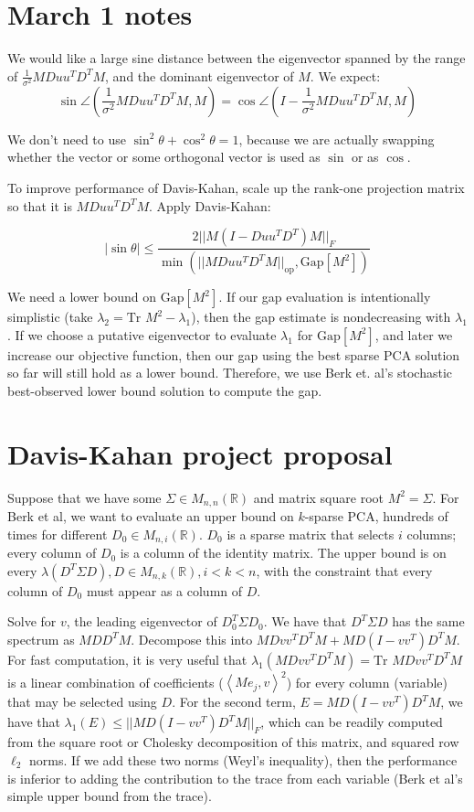 \documentclass{article}
\begin{document}
\section{March 1 notes}

We would like a large sine distance between the eigenvector spanned by the range of $\frac{1}{\sigma^2} MDuu^T D^T M$, and the dominant eigenvector of $M$. We expect: $$\sin \angle(\frac{1}{\sigma^2} MDuu^T D^T M, M) = \cos \angle (I-\frac{1}{\sigma^2} MDuu^T D^T M, M)$$

We don't need to use $\sin^2\theta + \cos^2\theta = 1$, because we are actually swapping whether the vector or some orthogonal vector is used as $\sin$ or as $\cos$.

To improve performance of Davis-Kahan, scale up the rank-one projection matrix so that it is $MDuu^T D^T M$. Apply Davis-Kahan:

$$
|\sin\theta|
\le
\frac{2||M(I-Duu^TD^T)M||_F}{\min(||MDuu^TD^TM||_\text{op}, \text{Gap}[M^2])}
$$

We need a lower bound on $\text{Gap}[M^2]$. If our gap evaluation is intentionally simplistic (take $\lambda_2 = \text{Tr }M^2 - \lambda_1$), then the gap estimate is nondecreasing with $\lambda_1$. If we choose a putative eigenvector to evaluate $\lambda_1$ for $\text{Gap}[M^2]$, and later we increase our objective function, then our gap using the best sparse PCA solution so far will still hold as a lower bound. Therefore, we use Berk et. al's stochastic best-observed lower bound solution to compute the gap.

\section{Davis-Kahan project proposal}

Suppose that we have some $\Sigma \in M_{n,n}(\mathbb{R})$ and matrix square root $M^2 = \Sigma$. For Berk et al, we want to evaluate an upper bound on $k$-sparse PCA, hundreds of times for different $D_0 \in M_{n,i}(\mathbb{R})$. $D_0$ is a sparse matrix that selects $i$ columns; every column of $D_0$ is a column of the identity matrix. The upper bound is on every $\lambda(D^T \Sigma D), D \in M_{n,k}(\mathbb{R}), i < k < n$, with the constraint that every column of $D_0$ must appear as a column of $D$.

Solve for $v$, the leading eigenvector of $D_0^T \Sigma D_0$. We have that $D^T\Sigma D$ has the same spectrum as $M D D^T M$. Decompose this into $M D v v^T D^T M + M D (I - vv^T) D^T M$. For fast computation, it is very useful that $\lambda_1(MDvv^T D^T M) = \text{Tr }MDvv^T D^T M$ is a linear combination of coefficients ($\left< M e_j, v \right>^2$) for every column (variable) that may be selected using $D$. For the second term, $E = MD(I-vv^T) D^T M$, we have that $\lambda_1(E) \le ||MD(I - vv^T) D^T M||_F$, which can be readily computed from the square root or Cholesky decomposition of this matrix, and squared row $\ell_2$ norms. If we add these two norms (Weyl's inequality), then the performance is inferior to adding the contribution to the trace from each variable (Berk et al's simple upper bound from the trace).
\end{document}
